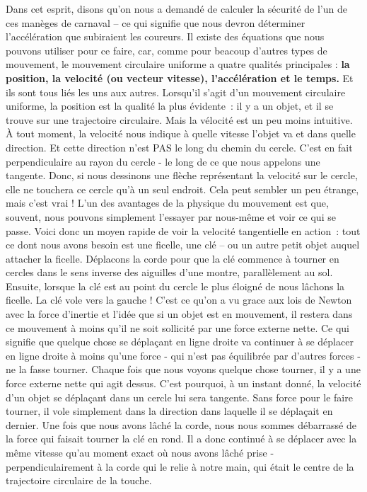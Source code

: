 Dans cet esprit, disons qu'on nous a demandé de calculer la sécurité de
l'un de ces manèges de carnaval -- ce qui signifie que nous devron
déterminer l'accélération que subiraient les coureurs. Il existe des
équations que nous pouvons utiliser pour ce faire, car, comme pour
beacoup d'autres types de mouvement, le mouvement circulaire uniforme a
quatre qualités principales : \textbf{la position, la velocité (ou
vecteur vitesse), l'accélération et le temps.} Et ils sont tous liés les
uns aux autres. Lorsqu'il s'agit d'un mouvement circulaire uniforme, la
position est la qualité la plus évidente~: il y a un objet, et il se
trouve sur une trajectoire circulaire. Mais la vélocité est un peu moins
intuitive. À tout moment, la velocité nous indique à quelle vitesse
l'objet va et dans quelle direction. Et cette direction n'est PAS le
long du chemin du cercle. C'est en fait perpendiculaire au rayon du
cercle - le long de ce que nous appelons une tangente. Donc, si nous
dessinons une flèche représentant la velocité sur le cercle, elle ne
touchera ce cercle qu'à un seul endroit. Cela peut sembler un peu
étrange, mais c'est vrai ! L'un des avantages de la physique du
mouvement est que, souvent, nous pouvons simplement l'essayer par
nous-même et voir ce qui se passe. Voici donc un moyen rapide de voir la
velocité tangentielle en action~: tout ce dont nous avons besoin est une
ficelle, une clé -- ou un autre petit objet auquel attacher la ficelle.
Déplacons la corde pour que la clé commence à tourner en cercles dans le
sens inverse des aiguilles d'une montre, parallèlement au sol. Ensuite,
lorsque la clé est au point du cercle le plus éloigné de nous lâchons la
ficelle. La clé vole vers la gauche ! C'est ce qu'on a vu grace aux lois
de Newton avec la force d'inertie et l'idée que si un objet est en
mouvement, il restera dans ce mouvement à moins qu'il ne soit sollicité
par une force externe nette. Ce qui signifie que quelque chose se
déplaçant en ligne droite va continuer à se déplacer en ligne droite à
moins qu'une force - qui n'est pas équilibrée par d'autres forces - ne
la fasse tourner. Chaque fois que nous voyons quelque chose tourner, il
y a une force externe nette qui agit dessus. C'est pourquoi, à un
instant donné, la velocité d'un objet se déplaçant dans un cercle lui
sera tangente. Sans force pour le faire tourner, il vole simplement dans
la direction dans laquelle il se déplaçait en dernier. Une fois que nous
avons lâché la corde, nous nous sommes débarrassé de la force qui
faisait tourner la clé en rond. Il a donc continué à se déplacer avec la
même vitesse qu'au moment exact où nous avons lâché prise -
perpendiculairement à la corde qui le relie à notre main, qui était le
centre de la trajectoire circulaire de la touche.


